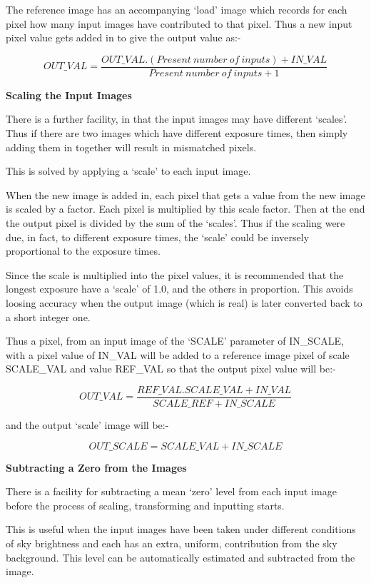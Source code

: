 \begin{small}
{{ The reference image has an accompanying `load' image which records for
 each pixel how many input images have contributed to that pixel. Thus
 a new input pixel value gets added in to give the output value as:-
 
 
$$    OUT\_VAL =  \frac{OUT\_VAL.(Present~number~of~inputs) + IN\_VAL}{
                     Present~number~of~inputs + 1} $$
 
 
{\hspace*{4ex} \bf Scaling the Input Images}
 
 There is a further facility, in that the input images may have
 different `scales'. Thus if there are two images which have different
 exposure times, then simply adding them in together will result in
 mismatched pixels.
 
 This is solved by applying a `scale' to each input image.
 
 When the new image is added in, each pixel that gets a value from the
 new image is scaled by a factor. Each pixel is multiplied by this
 scale factor. Then at the end the output pixel is divided by the sum
 of the `scales'. Thus if the scaling were due, in fact, to different
 exposure times, the `scale' could be inversely proportional to the
 exposure times.
 
 Since the scale is multiplied into the pixel values, it is recommended
 that the longest exposure have a `scale' of 1.0, and the others in
 proportion. This avoids loosing accuracy when the output image (which
 is real) is later converted back to a short integer one.
 
 Thus a pixel, from an input image of the `SCALE' parameter of IN\_SCALE,
 with a pixel value of IN\_VAL will be added to a reference image pixel
 of scale SCALE\_VAL and value REF\_VAL so that the output pixel value
 will be:-
 
 $$ OUT\_VAL = \frac{REF\_VAL.SCALE\_VAL + IN\_VAL}{SCALE\_REF + IN\_SCALE}$$
 
 and the output `scale' image will be:-
 
 $$ OUT\_SCALE = SCALE\_VAL + IN\_SCALE $$
 
 
{\hspace*{4ex} \bf Subtracting a Zero from the Images}
 
 There is a facility for subtracting a mean `zero' level from each input
 image before the process of scaling, transforming and inputting starts.
 
 This is useful when the input images have been taken under different
 conditions of sky brightness and each has an extra, uniform,
 contribution from the sky background. This level can be automatically
 estimated and subtracted from the image.
 
}}
\end{small}
